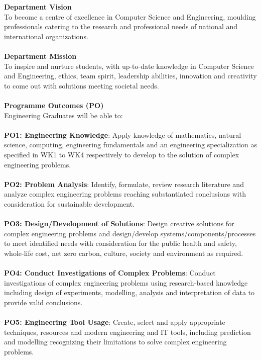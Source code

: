 \documentclass[12pt,a4paper,titlepage]{report}
\begin{document}
	\textbf{Department Vision} \\
	To become a centre of excellence in Computer Science and Engineering, moulding professionals catering to the research and professional needs of national and international organizations. \\ \\
	
	\textbf{Department Mission} \\
	To inspire and nurture students, with up-to-date knowledge in Computer Science and Engineering, ethics, team spirit, leadership abilities, innovation and creativity to come out with solutions meeting societal needs. \\ \\
	
	\textbf{Programme Outcomes (PO)} \\
	Engineering Graduates will be able to: \\ \\
	\textbf{PO1: Engineering Knowledge}: Apply knowledge of mathematics, natural science, computing, engineering fundamentals and an engineering specialization as specified in WK1 to WK4 respectively to develop to the solution of complex engineering problems.  \\ \\
	\textbf{PO2: Problem Analysis}: Identify, formulate, review research literature and analyze complex engineering problems reaching substantiated conclusions with consideration for sustainable development. \\ \\
	\textbf{PO3: Design/Development of Solutions}: Design creative solutions for complex engineering problems and design/develop systems/components/processes to meet identified needs with consideration for the public health and safety, whole-life cost, net zero carbon, culture, society and environment as required. \\ \\
	\textbf{PO4: Conduct Investigations of Complex Problems}: Conduct investigations of complex engineering problems using research-based knowledge including design of experiments, modelling, analysis and interpretation of data to provide valid conclusions. \\ \\
	\textbf{PO5: Engineering Tool Usage}: Create, select and apply appropriate techniques, resources and modern engineering and IT tools, including prediction and modelling recognizing their limitations to solve complex engineering problems. \\ \\
\end{document}
